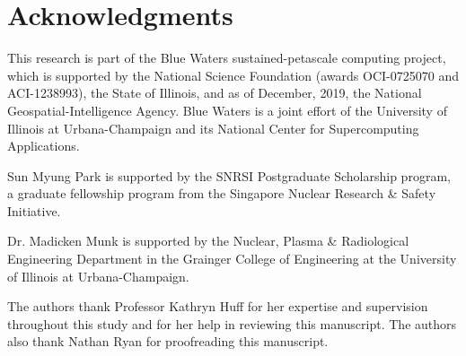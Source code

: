 \section*{Acknowledgments}

This research is part of the Blue Waters sustained-petascale computing project,
which is supported by the National Science Foundation (awards OCI-0725070 and
ACI-1238993), the State of Illinois, and as of December, 2019, the National
Geospatial-Intelligence Agency. Blue Waters is a joint effort of the University
of Illinois at Urbana-Champaign and its National Center for Supercomputing
Applications.

Sun Myung Park is supported by the SNRSI Postgraduate Scholarship program, a
graduate fellowship program from the Singapore Nuclear Research \& Safety
Initiative.

Dr. Madicken Munk is supported by the Nuclear, Plasma \& Radiological
Engineering Department in the Grainger College of Engineering at the University
of Illinois at Urbana-Champaign.

The authors thank Professor Kathryn Huff for her expertise and supervision
throughout this study and for her help in reviewing this manuscript. The authors
also thank Nathan Ryan for proofreading this manuscript.
